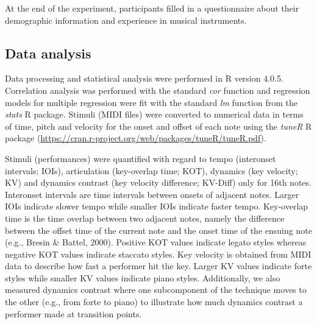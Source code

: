 \documentclass[
  man,floatsintext]{apa6}
\begin{document}
At the end of the experiment, participants filled in a questionnaire about their demographic information and experience in musical instruments.

\hypertarget{dataanalysis}{%
\subsection{Data analysis}\label{dataanalysis}}

Data processing and statistical analysis were performed in R version 4.0.5. Correlation analysis was performed with the standard \emph{cor} function and regression models for multiple regression were fit with the standard \emph{lm} function from the \emph{stats} R package. Stimuli (MIDI files) were converted to numerical data in terms of time, pitch and velocity for the onset and offset of each note using the \emph{tuneR} R package (\url{https://cran.r-project.org/web/packages/tuneR/tuneR.pdf}).

Stimuli (performances) were quantified with regard to tempo (interonset intervals; IOIs), articulation (key-overlap time; KOT), dynamics (key velocity; KV) and dynamics contrast (key velocity difference; KV-Diff) only for 16th notes. Interonset intervals are time intervals between onsets of adjacent notes. Larger IOIs indicate slower tempo while smaller IOIs indicate faster tempo. Key-overlap time is the time overlap between two adjacent notes, namely the difference between the offset time of the current note and the onset time of the ensuing note (e.g., Bresin \& Battel, 2000). Positive KOT values indicate legato styles whereas negative KOT values indicate staccato styles. Key velocity is obtained from MIDI data to describe how fast a performer hit the key. Larger KV values indicate forte styles while smaller KV values indicate piano styles. Additionally, we also measured dynamics contrast where one subcomponent of the technique moves to the other (e.g., from forte to piano) to illustrate how much dynamics contrast a performer made at transition points.
\end{document}
